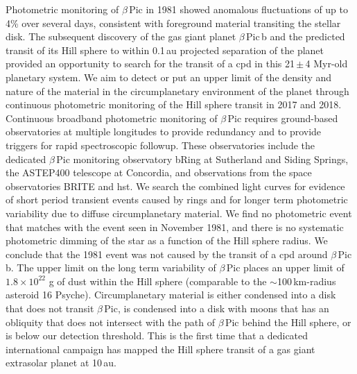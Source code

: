 \documentclass[longauth]{aa} %
\newcommand{\bpb}{$\beta$\,Pic\,b}
\newcommand{\bp}{$\beta$\,Pic}
\begin{document}
  \abstract
  {}%
  {
    Photometric monitoring of \bp{} in 1981 showed anomalous fluctuations of up to 4\% over several days, consistent with foreground material transiting the stellar disk.
    The subsequent discovery of the gas giant planet \bpb{} and the predicted transit of its Hill sphere to within 0.1\,au projected separation of the planet provided an opportunity to search for the transit of a \ac{cpd} in this 21\,$\pm$\,4 Myr-old planetary system.
We aim to detect or put an upper limit of the density and nature of the material in the circumplanetary environment of the planet through continuous photometric monitoring of the Hill sphere transit in 2017 and 2018.
  }
   {Continuous broadband photometric monitoring of \bp{} requires ground-based observatories at multiple longitudes to provide redundancy and to provide triggers for rapid spectroscopic followup.
   These observatories include the dedicated \bp{} monitoring observatory bRing at Sutherland and Siding Springs, the ASTEP400 telescope at Concordia, and observations
   from the space observatories BRITE and \ac{hst}.
   We search the combined light curves for evidence of short period transient events caused by rings and for longer term photometric variability due to diffuse circumplanetary material.}
   {We find no photometric event that matches with the event seen in November 1981, and there is no systematic photometric dimming of the star as a function of the Hill sphere radius.}
   {We conclude that the 1981 event was not caused by the transit of a \ac{cpd} around \bpb{}.
   The upper limit on the long term variability of \bp{} places an upper limit of $1.8\times 10^{22}$ g of dust within the Hill sphere (comparable to the $\sim$100\,km-radius asteroid 16 Psyche).
   Circumplanetary material is either condensed into a disk that does not transit \bp{}, is condensed into a disk with moons that has an obliquity that does not intersect with the path of \bp{} behind the Hill sphere, or is below our detection threshold.
   This is the first time that a dedicated international campaign has mapped the Hill sphere transit of a gas giant extrasolar planet at 10\,au.}
\end{document}
